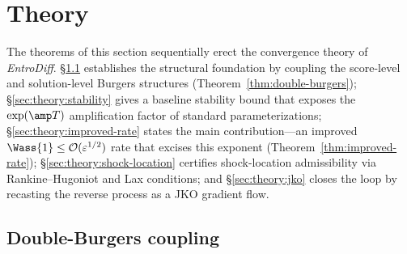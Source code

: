 %
%
%
\section{Theory}
\label{sec:theory}

The theorems of this section sequentially erect the convergence theory of \emph{EntroDiff}. §\ref{sec:theory:dburg} establishes the structural foundation by coupling the score-level and solution-level Burgers structures (Theorem~\ref{thm:double-burgers}); §\ref{sec:theory:stability} gives a baseline stability bound that exposes the $\exp(\amp T)$ amplification factor of standard parameterizations; §\ref{sec:theory:improved-rate} states the main contribution---an improved $\Wass{1} \le \mathcal{O}(\varepsilon^{1/2})$ rate that excises this exponent (Theorem~\ref{thm:improved-rate}); §\ref{sec:theory:shock-location} certifies shock-location admissibility via Rankine--Hugoniot and Lax conditions; and §\ref{sec:theory:jko} closes the loop by recasting the reverse process as a {JKO} gradient flow.

\subsection{Double-Burgers coupling}
\label{sec:theory:dburg}

